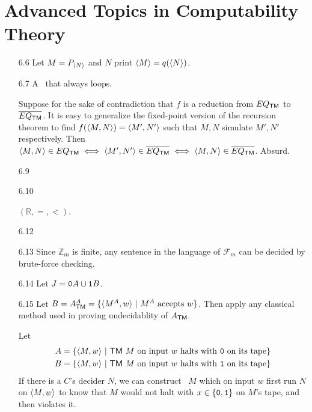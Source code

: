 \section{Advanced Topics in Computability Theory}

\begin{itemize}
	
	\item[6.6]
	Let $M = P_{\Bra{N}}$ and $N$ print $\Bra{M} = q(\Bra{N})$.
	
	\item[6.7]
	A \TM\ that always loops.
	
	\item[\Star 6.8]
	Suppose for the sake of contradiction that $f$ is a reduction from $EQ_{\TM}$ to $\overline{EQ_{\TM}}$. It is easy to generalize the fixed-point version of the recursion theorem to find $f(\Bra{M, N}) = \Bra{M', N'}$ such that $M, N$ simulate $M', N'$ respectively. Then $\Bra{M, N} \in EQ_{\TM} \iff \Bra{M', N'} \in \overline{EQ_{\TM}} \iff \Bra{M, N} \in \overline{EQ_{\TM}}$. Absurd.
	
	\item[6.9]
	\Omit
	
	\item[6.10]
	\Omit
	
	\item[\Star 6.11]
	$(\mathbb{R}, =, <)$.
	
	\item[6.12]
	\Omit
	
	\item[6.13]
	Since $\mathbb{Z}_m$ is finite, any sentence in the language of $\mathcal{F}_m$ can be decided by brute-force checking.
	
	\item[6.14]
	Let $J = \TT{0}A \cup \TT{1}B$.
	
	\item[6.15]
	Let $B = A_{\TM}^A = \{ \Bra{M^{A}, w} \ | \ \text{$M^A$ accepts $w$} \}$. Then apply any classical method used in proving undecidablity of $A_{\TM}$.
	
	\item[\Star 6.16]
	\Empty
	
	\item[\Star 6.17]
	Let 
	\begin{align*}
		A = \{ \Bra{M, w} \ | \ \text{\TM\ $M$ on input $w$ halts with \TT{0} on its tape} \} \\
		B = \{ \Bra{M, w} \ | \ \text{\TM\ $M$ on input $w$ halts with \TT{1} on its tape} \}
	\end{align*}
	If there is a $C$'s decider $N$, we can construct \TM\ $M$ which on input $w$ first run $N$ on $\Bra{M, w}$ to know that $M$ would not halt with $x \in \{ \TT{0}, \TT{1} \}$ on $M$'s tape, and then violates it.
	

\end{itemize}

